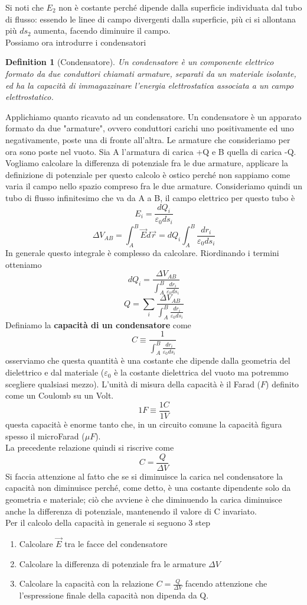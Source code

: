 \documentclass[10pt,a4paper]{article}
\newtheorem{definition}{Definition}
\begin{document}
Si noti che \(E_2\) non è costante perché dipende dalla superficie individuata dal tubo di flusso: essendo le linee di campo divergenti dalla superficie, più ci si allontana più \(ds_2\) aumenta, facendo diminuire il campo.\\
Possiamo ora introdurre i condensatori
\begin{definition}[Condensatore]
	Un condensatore è un componente elettrico formato da due conduttori chiamati armature, separati da un materiale isolante, ed ha la capacità di immagazzinare l'energia elettrostatica associata a un campo elettrostatico.
\end{definition}
Applichiamo quanto ricavato ad un condensatore. Un condensatore è un apparato formato da due "armature", ovvero conduttori carichi uno positivamente ed uno negativamente, poste una di fronte all'altra. Le armature che consideriamo per ora sono poste nel vuoto. Sia A l'armatura di carica +Q e B quella di carica -Q. Vogliamo calcolare la differenza di potenziale fra le due armature, applicare la definizione di potenziale per questo calcolo è ostico perché non sappiamo come varia il campo nello spazio compreso fra le due armature. Consideriamo quindi un tubo di flusso infinitesimo che va da A a B, il campo elettrico per questo tubo è
\[E_i  = \frac{dQ_i}{\varepsilon_0 ds_i}\]
\[\Delta V_{AB} = \int_{A}^{B}\vec{E}d\vec{r} =dQ_i \int_{A}^{B}\frac{dr_i}{\varepsilon_0 ds_i}\]
In generale questo integrale è complesso da calcolare. Riordinando i termini otteniamo
\[dQ_i = \frac{\Delta V_{AB}}{\int_{A}^{B}\frac{dr_i}{\varepsilon_0 ds_i}}\]
\[Q = \sum_i\frac{\Delta V_{AB}}{\int_{A}^{B}\frac{dr_i}{\varepsilon_0 ds_i}}\]
Definiamo la \textbf{capacità di un condensatore} come
\[C\equiv \frac{1}{{ \int_{A}^{B}\frac{dr_i}{\varepsilon_0 ds_i}}}\]
osserviamo che questa quantità è una costante che dipende dalla geometria del dielettrico e dal materiale ($\varepsilon_0$ è la costante dielettrica del vuoto ma potremmo scegliere qualsiasi mezzo). L'unità di misura della capacità è il Farad (\(F\)) definito come un Coulomb su un Volt. 
\[1F \equiv \frac{1C}{1V}\]
questa capacità è enorme tanto che, in un circuito comune la capacità figura spesso il microFarad (\(\mu F\)).\\
La precedente relazione quindi si riscrive come
\[C = \frac{Q}{\Delta V}\]
Si faccia attenzione al fatto che se si diminuisce la carica nel condensatore la capacità non diminuisce perché, come detto, è una costante dipendente solo da geometria e materiale; ciò che avviene è che diminuendo la carica diminuisce anche la differenza di potenziale, mantenendo il valore di C invariato.\\
Per il calcolo della capacità in generale si seguono 3 step
\begin{enumerate}
\item Calcolare $\vec{E}$ tra le facce del condensatore
\item Calcolare la differenza di potenziale fra le armature \(\Delta V\)
\item Calcolare la capacità con la relazione \(C=\frac{Q}{\Delta V}\) facendo attenzione che l'espressione finale della capacità non dipenda da Q. 
\end{enumerate} 
\end{document}
